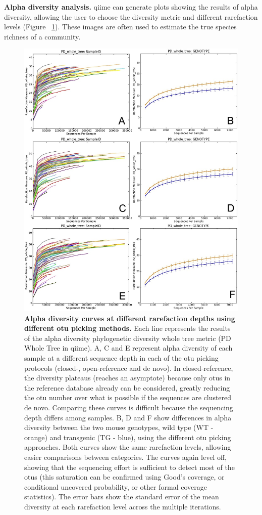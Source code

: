 \textbf{Alpha diversity analysis.} \gls{qiime} can generate plots showing the results of
alpha diversity, allowing the user to choose the diversity metric and different
rarefaction levels (Figure ~\ref{bfigure6}). These images are often used to estimate
the true species richness of a community.

\begin{figure}[htbp]
\includegraphics[width=0.75\columnwidth]{chapter_book_figures/Figure_6.jpg}
\caption[Alpha diversity curves at different rarefaction depths using different \gls{otu} picking methods]{\textbf{Alpha diversity curves at different rarefaction depths using different \gls{otu} picking methods.}
Each line represents the results of the alpha diversity phylogenetic diversity whole
tree metric (PD Whole Tree in \gls{qiime}). A, C and E represent alpha diversity of each sample
at a different sequence depth in each of the \gls{otu} picking protocols (closed-, open-reference and
de novo). In closed-reference, the diversity plateaus (reaches an asymptote) because only \gls{otu}s
in the reference database already can be considered, greatly reducing the \gls{otu} number over what
is possible if the sequences are clustered de novo. Comparing these curves is difficult because
the sequencing depth differs among samples. B, D and F show differences in alpha diversity between
the two mouse genotypes, wild type (WT - orange) and transgenic (TG - blue), using the different
\gls{otu} picking approaches. Both curves show the same rarefaction levels, allowing easier comparisons
between categories. The curves again level off, showing that the sequencing effort is sufficient
to detect most of the \gls{otu}s (this saturation can be confirmed using Good's coverage, or conditional
uncovered probability, or other formal coverage statistics). The error bars show the standard error
of the mean diversity at each rarefaction level across the multiple iterations.}
\label{bfigure6}
\end{figure}

